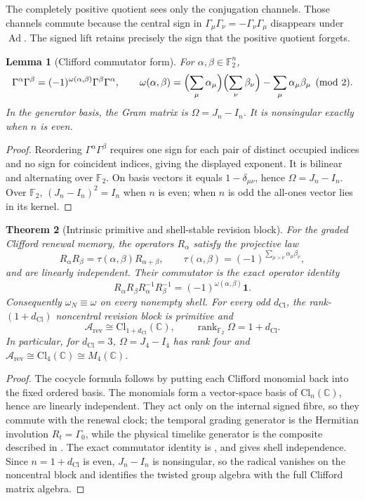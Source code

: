 \documentclass[11pt]{article}
\newtheorem{theorem}{Theorem}[section]
\newtheorem{lemma}[theorem]{Lemma}
\theoremstyle{definition}
\theoremstyle{remark}
\newcommand{\C}{\mathbb{C}}
\newcommand{\F}{\mathbb{F}}
\newcommand{\Arev}{\mathcal{A}_{\mathrm{rev}}}
\newcommand{\Cl}{\mathrm{Cl}}
\newcommand{\dCl}{d_{\mathrm{Cl}}}
\newcommand{\rank}{\operatorname{rank}}
\newcommand{\one}{\mathbf{1}}
\begin{document}
The completely positive quotient sees only the conjugation channels.  Those
channels commute because the central sign in
\(\Gamma_\mu\Gamma_\nu=-\Gamma_\nu\Gamma_\mu\) disappears under
\(\operatorname{Ad}\).  The signed lift retains precisely the sign that the
positive quotient forgets.

\begin{lemma}[Clifford commutator form]
\label{lem:graded-clifford-form}
For \(\alpha,\beta\in\F_2^n\),
\[
 \Gamma^\alpha\Gamma^\beta
 =(-1)^{\omega(\alpha,\beta)}\Gamma^\beta\Gamma^\alpha,
 \qquad
 \omega(\alpha,\beta)=
 \Bigl(\sum_\mu\alpha_\mu\Bigr)
 \Bigl(\sum_\nu\beta_\nu\Bigr)
 -\sum_\mu\alpha_\mu\beta_\mu\pmod2 .
\]
In the generator basis, the Gram matrix is
\(\Omega=J_n-I_n\).  It is nonsingular exactly when \(n\) is even.
\end{lemma}

\begin{proof}
Reordering \(\Gamma^\alpha\Gamma^\beta\) requires one sign for each pair of
distinct occupied indices and no sign for coincident indices, giving the
displayed exponent.  It is bilinear and alternating over \(\F_2\).  On basis
vectors it equals \(1-\delta_{\mu\nu}\), hence \(\Omega=J_n-I_n\).  Over
\(\F_2\), \((J_n-I_n)^2=I_n\) when \(n\) is even; when \(n\) is odd the
all-ones vector lies in its kernel.
\end{proof}

\begin{theorem}[Intrinsic primitive and shell-stable revision block]
\label{thm:intrinsic-graded-clifford-datum}
For the graded Clifford renewal memory, the operators \(R_\alpha\) satisfy the
projective law
\[
 R_\alpha R_\beta=\tau(\alpha,\beta)R_{\alpha+\beta},
 \qquad
 \tau(\alpha,\beta)=
 (-1)^{\sum_{\mu>\nu}\alpha_\mu\beta_\nu},
\]
and are linearly independent.  Their commutator is the exact operator identity
\[
 R_\alpha R_\beta R_\alpha^{-1}R_\beta^{-1}
 =(-1)^{\omega(\alpha,\beta)}\one .
\]
Consequently \(\omega_N\equiv\omega\) on every nonempty shell.  For every odd
\(\dCl\), the rank-\((1+\dCl)\) noncentral revision block is primitive and
\[
 \Arev\cong\Cl_{1+\dCl}(\C),\qquad
 \rank_{\F_2}\Omega=1+\dCl .
\]
In particular, for \(\dCl=3\), \(\Omega=J_4-I_4\) has rank four and
\(\Arev\cong\Cl_4(\C)\cong M_4(\C)\).
\end{theorem}

\begin{proof}
The cocycle formula follows by putting each Clifford monomial back into the
fixed ordered basis.  The monomials form a vector-space basis of
\(\Cl_n(\C)\), hence are linearly independent.  They act only on the internal
signed fibre, so they commute with the renewal clock; the temporal grading
generator is the Hermitian involution \(R_t=\Gamma_0\), while the physical
timelike generator is the composite described in
.  The exact
commutator identity is , and
 gives shell independence.  Since
\(n=1+\dCl\) is even, \(J_n-I_n\) is nonsingular, so the radical vanishes on
the noncentral block and  identifies the twisted
group algebra with the full Clifford matrix algebra.
\end{proof}
\end{document}

